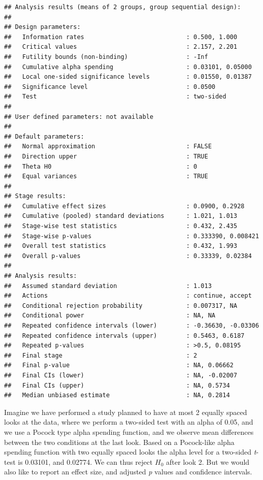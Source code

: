 \documentclass[
  oneside]{krantz}
\begin{document}
\begin{verbatim}
## Analysis results (means of 2 groups, group sequential design):
## 
## Design parameters:
##   Information rates                            : 0.500, 1.000 
##   Critical values                              : 2.157, 2.201 
##   Futility bounds (non-binding)                : -Inf 
##   Cumulative alpha spending                    : 0.03101, 0.05000 
##   Local one-sided significance levels          : 0.01550, 0.01387 
##   Significance level                           : 0.0500 
##   Test                                         : two-sided 
## 
## User defined parameters: not available
## 
## Default parameters:
##   Normal approximation                         : FALSE 
##   Direction upper                              : TRUE 
##   Theta H0                                     : 0 
##   Equal variances                              : TRUE 
## 
## Stage results:
##   Cumulative effect sizes                      : 0.0900, 0.2928 
##   Cumulative (pooled) standard deviations      : 1.021, 1.013 
##   Stage-wise test statistics                   : 0.432, 2.435 
##   Stage-wise p-values                          : 0.333390, 0.008421 
##   Overall test statistics                      : 0.432, 1.993 
##   Overall p-values                             : 0.33339, 0.02384 
## 
## Analysis results:
##   Assumed standard deviation                   : 1.013 
##   Actions                                      : continue, accept 
##   Conditional rejection probability            : 0.007317, NA 
##   Conditional power                            : NA, NA 
##   Repeated confidence intervals (lower)        : -0.36630, -0.03306 
##   Repeated confidence intervals (upper)        : 0.5463, 0.6187 
##   Repeated p-values                            : >0.5, 0.08195 
##   Final stage                                  : 2 
##   Final p-value                                : NA, 0.06662 
##   Final CIs (lower)                            : NA, -0.02007 
##   Final CIs (upper)                            : NA, 0.5734 
##   Median unbiased estimate                     : NA, 0.2814
\end{verbatim}

Imagine we have performed a study planned to have at most 2 equally spaced looks at the data, where we perform a two-sided test with an alpha of 0.05, and we use a Pocock type alpha spending function, and we observe mean differences between the two conditions at the last look. Based on a Pocock-like alpha spending function with two equally spaced looks the alpha level for a two-sided \emph{t}-test is 0.03101, and 0.02774. We can thus reject \(H_0\) after look 2. But we would also like to report an effect size, and adjusted \emph{p} values and confidence intervals.
\end{document}

